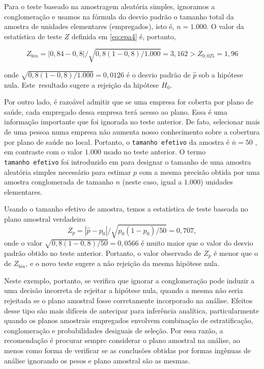 \documentclass[]{book}
\theoremstyle{definition}
\theoremstyle{definition}
\theoremstyle{definition}
\theoremstyle{remark}
\begin{document}
Para o teste baseado na amostragem aleatória simples, ignoramos a
conglomeração e usamos na fórmula do desvio padrão o tamanho total da
amostra de unidades elementares (empregados), isto é, \(n=1.000\). O
valor da estatística de teste \(Z\) definida em \eqref{eq:epa4} é,
portanto,

\begin{equation}
Z_{bin}=|0,84-0,8|/\sqrt{0,8\left( 1-0,8\right) /1.000}=3,162>Z_{0,025}=1,96
\label{eq:epa5}
\end{equation}

onde \(\sqrt{0,8\left( 1-0,8\right) /1.000}=0,0126\) é o desvio padrão
de \(\widehat{p}\) sob a hipótese nula. Este~resultado sugere a rejeição
da hipótese \(H_{0}\).

Por outro lado, é razoável admitir que se uma empresa for coberta por
plano de saúde, cada empregado dessa empresa terá acesso ao plano. Essa
é uma informação importante que foi ignorada no teste anterior. De fato,
selecionar mais de uma pessoa numa empresa não aumenta nosso
conhecimento sobre a cobertura por plano de saúde no local. Portanto, o
\texttt{tamanho\ efetivo} da amostra é \(\overline{n}=50\) , em
contraste com o valor \(1.000\) usado no teste anterior. O termo
\texttt{tamanho\ efetivo} foi introduzido em \citep{Kish65} para
designar o tamanho de uma amostra aleatória simples necessário para
estimar \(p\) com a mesma precisão obtida por uma amostra conglomerada
de tamanho \(n\) (neste caso, igual a \(1.000\)) unidades elementares.

Usando o tamanho efetivo de amostra, temos a estatística de teste
baseada no plano amostral verdadeiro \[
Z_{p}=|\widehat{p}-p_{0}|/\sqrt{p_{0}\left( 1-p_{0}\right) /50}=0,707 ,
\] onde o valor \(\sqrt{0,8\left( 1-0,8\right) /50}=0,0566\) é muito
maior que o valor do desvio padrão obtido no teste anterior. Portanto, o
valor observado de \(Z_{p}\) é menor que o de \(Z_{bin}\), e o novo
teste sugere a não rejeição da mesma hipótese nula.

Neste exemplo, portanto, se verifica que ignorar a conglomeração pode
induzir a uma decisão incorreta de rejeitar a hipótese nula, quando a
mesma não seria rejeitada se o plano amostral fosse corretamente
incorporado na análise. Efeitos desse tipo são mais difíceis de
antecipar para inferência analítica, particularmente quando os planos
amostrais empregados envolvem combinação de estratificação,
conglomeração e probabilidades desiguais de seleção. Por essa razão, a
recomendação é procurar sempre considerar o plano amostral na análise,
ao menos como forma de verificar se as conclusões obtidas por formas
ingênuas de análise ignorando os pesos e plano amostral são as mesmas.
\end{document}
